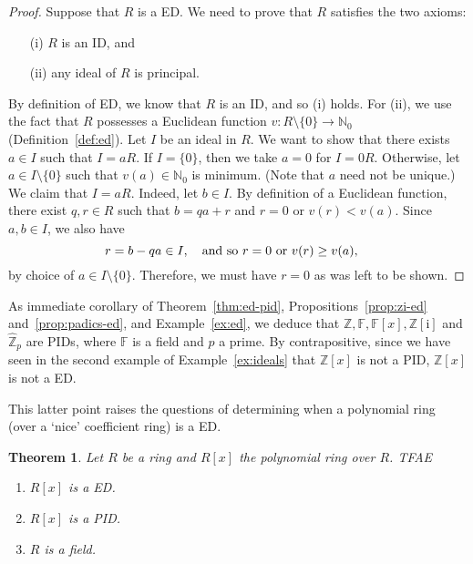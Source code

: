\documentclass[12pt]{article}
\newcommand{\qbox}[1]{\quad\hbox{#1}\quad}
\newtheorem{thm}{Theorem}[section]
\theoremstyle{definition}
\newcounter{ex}\renewcommand\theex{\arabic{ex}}
\newcommand{\N}{\ensuremath{\mathbb{N}}}
\newcommand{\Z}{\ensuremath{\mathbb{Z}}}
\newcommand{\F}{\ensuremath{\mathbb{F}}}
\def\ii{\mathrm i}
\def\Zp{\widehat{\Z}_p}
\begin{document}
\begin{proof}
Suppose that $R$ is a ED.
We need to prove that $R$ satisfies the two axioms:
\begin{itemize}
\item[(i)] $R$ is an ID, and
\item[(ii)] any ideal of $R$ is principal.
\end{itemize}
By definition of ED, we know that $R$ is an ID, and so (i) holds. For
(ii), we use the fact that $R$ possesses a Euclidean function
$v:R\setminus\{0\}\to\N_0$ (Definition~\ref{def:ed}).
Let $I$ be an ideal in $R$.
We want to show that there exists $a\in I$ such that $I=aR$.
If $I=\{0\}$, then we take $a=0$ for $I=0R$.
Otherwise, let $a\in I\setminus\{0\}$ such that $v(a)\in\N_0$ is
minimum. (Note that $a$ need not be unique.)
We claim that $I=aR$. Indeed, let $b\in I$. By definition of a
Euclidean function, there exist $q,r\in R$ such that
$b=qa+r$ and $r=0$ or $v(r)<v(a)$. Since $a,b\in I$, we also have
$$r=b-qa\in I,\qbox{and so $r=0$ or $v(r)\geq v(a)$,}$$
by choice of $a\in I\setminus\{0\}$. Therefore, we must have $r=0$ as
was left to be shown.
\end{proof}

As immediate corollary of Theorem~\ref{thm:ed-pid},
Propositions~\ref{prop:zi-ed} and~\ref{prop:padics-ed}, and
Example~\ref{ex:ed}, we deduce that $\Z,\F,\F[x],\Z[\ii]$ and $\Zp$
are PIDs, where $\F$ is a field and $p$ a prime. By contrapositive,
since we have seen in the second example of Example~\ref{ex:ideals}
that $\Z[x]$ is not a PID, $\Z[x]$ is not a ED.

This latter point raises the questions of determining when a
polynomial ring (over a `nice' coefficient ring) is a ED.

\begin{thm}\label{thm:ed-poly}
Let $R$ be a ring and $R[x]$ the polynomial ring over $R$. TFAE
\begin{enumerate}
\item\label{it:ed-poly1} $R[x]$ is a ED.
\item\label{it:ed-poly2} $R[x]$ is a PID.
\item\label{it:ed-poly3} $R$ is a field.
\end{enumerate}
\end{thm}
\end{document}
